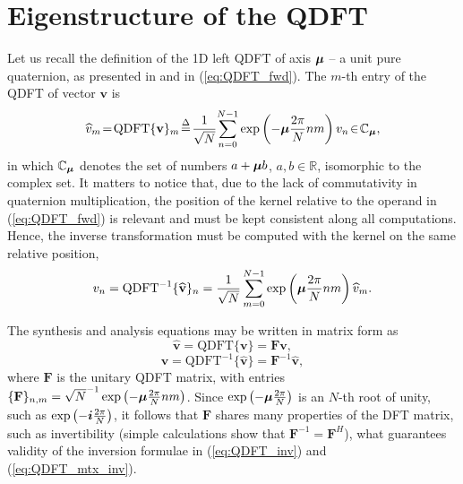 \section{Eigenstructure of the QDFT}
\label{sec:autoestrutura}
Let us recall the definition of the 1D left QDFT of axis $ \boldsymbol{\mu} $ -- a unit pure quaternion, as presented in \cite[Sec. 3.3.1]{ell2014quaternion} and in (\ref{eq:QDFT_fwd}). The $ m$-th entry of the QDFT of vector $ \mathbf{v} $ is
\begin{equation}
\label{eq:QDFT_fwd}
\!\widehat{v}_m \!=\! \text{QDFT}\{ \mathbf{v} \}_m \!\overset{\Delta}{=}\! \frac{1}{\sqrt{N}} \!\sum_{n=0}^{N-1}  \exp \left( -\qmu \frac{2\pi}{N} nm \right) v_n \!\in\! \mathbb{C}_{\qmu},\!
\end{equation}
in which $ \mathbb{C}_{\boldsymbol{\mu}} $ denotes the set of numbers $ a + \boldsymbol{\mu} b $, $ a,b \in \mathbb{R} $, isomorphic to the complex set. It matters to notice that, due to the lack of commutativity in quaternion multiplication, the position of the kernel relative to the operand in (\ref{eq:QDFT_fwd}) is relevant and must be kept consistent along all computations. Hence, the inverse transformation must be computed with the kernel on the same relative position,
\begin{equation}
\label{eq:QDFT_inv}
v_n = \text{QDFT}^{-1}\{ \widehat{\mathbf{v}} \}_n = \frac{1}{\sqrt{N}}\sum_{m=0}^{N-1}  \exp \left( \boldsymbol{\mu} \frac{2\pi}{N} nm \right) \widehat{v}_m.
\end{equation}

The synthesis and analysis equations may be written in matrix form as
\begin{equation}
\label{eq:QDFT}
\widehat{\mathbf{v}} = \text{QDFT}\{ \mathbf{v} \} = \mathbf{F} \mathbf{v},
\end{equation}
\begin{equation}
\label{eq:QDFT_mtx_inv}
\mathbf{v} = \text{QDFT}^{-1}\{ \widehat{\mathbf{v}} \} = \mathbf{F}^{-1} \widehat{\mathbf{v}},
\end{equation}
where $ \mathbf{F} $ is the unitary QDFT matrix, with entries $ \{\mathbf{F}\}_{n,m} = \sqrt{N}^{-1} \exp \left( -\boldsymbol{\mu} \frac{2\pi}{N} nm \right)$. Since $ \exp \left( -\boldsymbol{\mu} \frac{2\pi}{N} \right) $ is an $ N $-th root of unity, such as $ \exp \left( -\boldsymbol{i} \frac{2\pi}{N} \right) $, it follows that $ \mathbf{F} $ shares many properties of the DFT matrix, such as invertibility (simple calculations show that $ \mathbf{F}^{-1} = \mathbf{F}^{H} $), what guarantees validity of the inversion formulae in (\ref{eq:QDFT_inv}) and (\ref{eq:QDFT_mtx_inv}).

